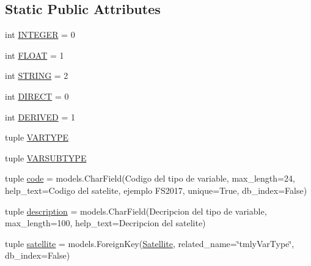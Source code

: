 \subsection*{Static Public Attributes}
\begin{DoxyCompactItemize}
\item 
int \hyperlink{class_ground_segment_1_1models_1_1_tlmy_var_type_1_1_tlmy_var_type_adc451c520401bd045ade72bc72a430af}{I\+N\+T\+E\+G\+E\+R} = 0
\item 
int \hyperlink{class_ground_segment_1_1models_1_1_tlmy_var_type_1_1_tlmy_var_type_afdb00719ba2166de0c0a88c99831ce17}{F\+L\+O\+A\+T} = 1
\item 
int \hyperlink{class_ground_segment_1_1models_1_1_tlmy_var_type_1_1_tlmy_var_type_afcb0a3433a7231e0f75a92c43ef2443a}{S\+T\+R\+I\+N\+G} = 2
\item 
int \hyperlink{class_ground_segment_1_1models_1_1_tlmy_var_type_1_1_tlmy_var_type_a2adb7f0f283f7dc6885d63cd21b25f8b}{D\+I\+R\+E\+C\+T} = 0
\item 
int \hyperlink{class_ground_segment_1_1models_1_1_tlmy_var_type_1_1_tlmy_var_type_a8b88adc2cddecf7dce5eedc89042a2cd}{D\+E\+R\+I\+V\+E\+D} = 1
\item 
tuple \hyperlink{class_ground_segment_1_1models_1_1_tlmy_var_type_1_1_tlmy_var_type_a9a9b6dcda859afbf512855888fd787fa}{V\+A\+R\+T\+Y\+P\+E}
\item 
tuple \hyperlink{class_ground_segment_1_1models_1_1_tlmy_var_type_1_1_tlmy_var_type_a4d07d8c0064f8f2d2edbfb5b53001d9b}{V\+A\+R\+S\+U\+B\+T\+Y\+P\+E}
\item 
tuple \hyperlink{class_ground_segment_1_1models_1_1_tlmy_var_type_1_1_tlmy_var_type_ace8a3c643e6fbce147864aae31381c70}{code} = models.\+Char\+Field(\textquotesingle{}Codigo del tipo de variable\textquotesingle{}, max\+\_\+length=24, help\+\_\+text=\textquotesingle{}Codigo del satelite, ejemplo F\+S2017\textquotesingle{}, unique=True, db\+\_\+index=False)
\item 
tuple \hyperlink{class_ground_segment_1_1models_1_1_tlmy_var_type_1_1_tlmy_var_type_a38f73b6c16a785c3107380614d676116}{description} = models.\+Char\+Field(\textquotesingle{}Decripcion del tipo de variable\textquotesingle{}, max\+\_\+length=100, help\+\_\+text=\textquotesingle{}Decripcion del satelite\textquotesingle{})
\item 
tuple \hyperlink{class_ground_segment_1_1models_1_1_tlmy_var_type_1_1_tlmy_var_type_a19f48547f2aaf1df7c8271723fad516e}{satellite} = models.\+Foreign\+Key(\hyperlink{class_ground_segment_1_1models_1_1_satellite_1_1_satellite}{Satellite}, related\+\_\+name=\char`\"{}tmly\+Var\+Type\char`\"{}, db\+\_\+index=False)

\end{DoxyCompactItemize}
